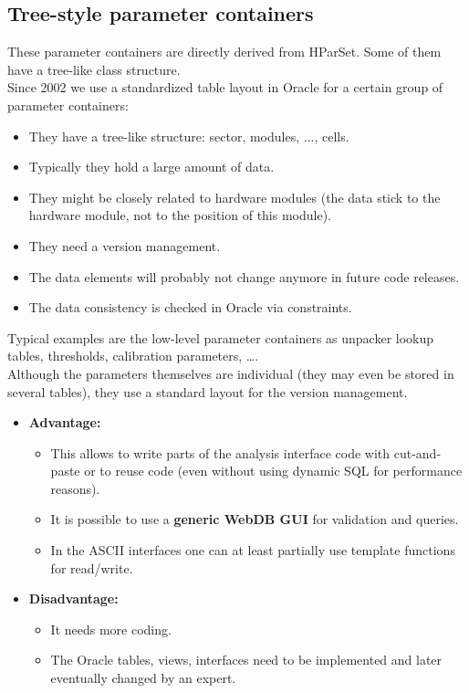 \subsection[Tree-style parameter containers]{Tree-style parameter containers} \label{sec:rtdbTreeStyleParamCont}
These parameter containers are directly derived from HParSet. Some of them have a tree-like class structure.\\ 
Since 2002 we use a standardized table layout in Oracle for a certain group of parameter containers:
\begin{itemize}
 \item They have a tree-like structure: sector, modules, ..., cells.
 \item Typically they hold a large amount of data.
 \item They might be closely related to hardware modules (the data stick to the hardware module, not to the position of this module).
 \item They need a version management.
 \item The data elements will probably not change anymore in future code releases.
 \item The data consistency is checked in Oracle via constraints.
\end{itemize}
Typical examples are the low-level parameter containers as unpacker lookup tables, thresholds, calibration parameters, \ldots.\\

Although the parameters themselves are individual (they may even be stored in several tables), they use a standard layout for 
the version management.
\begin{itemize}
  \item \textbf{Advantage:}
    \begin{itemize}
      \item This allows to write parts of the analysis interface code with cut-and-paste or to reuse code (even without 
            using dynamic SQL for performance reasons).
      \item It is possible to use a \textbf{generic WebDB GUI} for validation and queries.
      \item In the ASCII interfaces one can at least partially use template functions for read/write.
    \end{itemize}
  \item \textbf{Disadvantage:}
    \begin{itemize}
      \item It needs more coding.
      \item The Oracle tables, views, interfaces need to be implemented and later eventually changed by an expert.
    \end{itemize}
\end{itemize}


